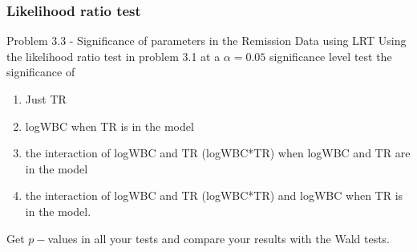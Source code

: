 \documentclass{beamer}
\theoremstyle{definition}
\begin{document}
\begin{frame}
\frametitle{Likelihood ratio test}
\begin{block}{Problem 3.3 - Significance of parameters in the Remission Data using LRT}
Using the likelihood ratio test in problem 3.1 at a $\alpha=0.05$ significance level test the significance of
\begin{enumerate}
\item Just TR
\item logWBC when TR is in the model
\item the interaction of logWBC and TR (logWBC*TR) when logWBC and TR are in the model
\item the interaction of logWBC and TR (logWBC*TR) and logWBC when TR is in the model.
\end{enumerate}
Get $p-$values in all your tests and compare your results with the Wald tests.
\end{block}
\end{frame}
\end{document}
